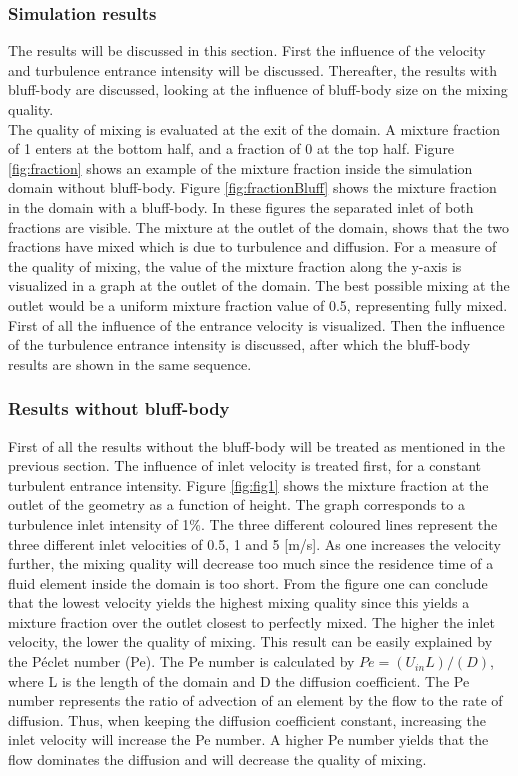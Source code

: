 \documentclass{CFD2017}
\begin{document}
\subsubsection{Simulation results}
The results will be discussed in this section. First the influence of the velocity and turbulence entrance intensity will be discussed. Thereafter, the results with bluff-body are discussed, looking at the influence of bluff-body size on the mixing quality.\\
The quality of mixing is evaluated at the exit of the domain. A mixture fraction of 1 enters at the bottom half, and a fraction of 0 at the top half. Figure \ref{fig:fraction} shows an example of the mixture fraction inside the simulation domain without bluff-body. Figure \ref{fig:fractionBluff} shows the mixture fraction in the domain with a bluff-body. In these figures the separated inlet of both fractions are visible. The mixture at the outlet of the domain, shows that the two fractions have mixed which is due to turbulence and diffusion. For a measure of the quality of mixing, the value of the mixture fraction along the y-axis is visualized in a graph at the outlet of the domain. The best possible mixing at the outlet would be a uniform mixture fraction value of 0.5, representing fully mixed.\\
First of all the influence of the entrance velocity is visualized. Then the influence of the turbulence entrance intensity is discussed, after which the bluff-body results are shown in the same sequence.


\subsubsection{Results without bluff-body}
First of all the results without the bluff-body will be treated as mentioned in the previous section. The influence of inlet velocity is treated first, for a constant turbulent entrance intensity. Figure \ref{fig:fig1} shows the mixture fraction at the outlet of the geometry as a function of height. The graph corresponds to a turbulence inlet intensity of 1\%. The three different coloured lines represent the three different inlet velocities of 0.5, 1 and 5 [m/s]. As one increases the velocity further, the mixing quality will decrease too much since the residence time of a fluid element inside the domain is too short. From the figure one can conclude that the lowest velocity yields the highest mixing quality since this yields a mixture fraction over the outlet closest to perfectly mixed. The higher the inlet velocity, the lower the quality of mixing. This result can be easily explained by the P\'eclet number (Pe). The Pe number is calculated by $Pe=(U_{in}L)/(D)$, where L is the length of the domain and D the diffusion coefficient. The Pe number represents the ratio of advection of an element by the flow to the rate of diffusion. Thus, when keeping the diffusion coefficient constant, increasing the inlet velocity will increase the Pe number. A higher Pe number yields that the flow dominates the diffusion and will decrease the quality of mixing.
\end{document}
